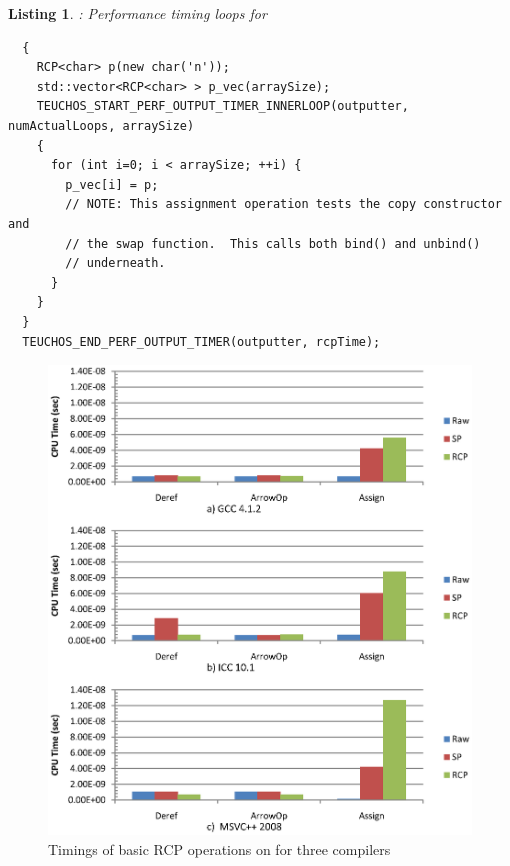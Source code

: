 \documentclass[pdf,ps2pdf,11pt]{SANDreport}
\newtheorem{listing}{Listing}
\begin{document}
\begin{listing}: Performance timing loops for {} \\
\label{listing:RCP-assignment-timing}
{\small\begin{verbatim}
  {
    RCP<char> p(new char('n'));
    std::vector<RCP<char> > p_vec(arraySize);
    TEUCHOS_START_PERF_OUTPUT_TIMER_INNERLOOP(outputter, numActualLoops, arraySize)
    {
      for (int i=0; i < arraySize; ++i) {
        p_vec[i] = p;
        // NOTE: This assignment operation tests the copy constructor and
        // the swap function.  This calls both bind() and unbind()
        // underneath.
      }
    }
  }
  TEUCHOS_END_PERF_OUTPUT_TIMER(outputter, rcpTime);
\end{verbatim}}
\end{listing}


{\bsinglespace
\begin{figure}
\begin{center}
\includegraphics*[angle=0,scale=1.00]{RCPTimings}
\end{center}
\caption{
\label{fig:RCPTimings}
Timings of basic RCP operations on for three compilers}
\end{figure}
\esinglespace}
\end{document}
